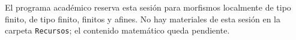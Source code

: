 \begin{nota}
El programa académico reserva esta sesión para morfismos localmente de tipo finito, de tipo finito, finitos y afines. No hay materiales de esta sesión en la carpeta \texttt{Recursos}; el contenido matemático queda pendiente.
\end{nota}
